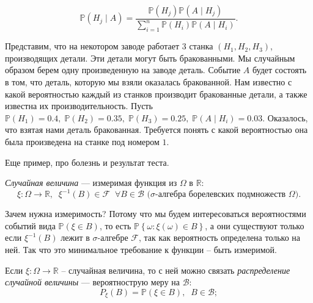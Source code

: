 \documentclass[12pt,a4paper]{article}
\begin{document}
\begin{definition}
    \[\mathbb{P}(H_j \mid A) = \frac{\mathbb{P} (H_j) \mathbb{P} (A \mid H_j)}{ \sum\limits_{i = 1}^{n} \mathbb{P}(H_i) \mathbb{P}(A \mid H_i)}.\]
\end{definition}

\begin{example}
    Представим, что на некотором заводе работает \(3\) станка \((H_1, H_2, H_3)\), производящих детали. Эти детали могут быть бракованными. 
    Мы случайным образом берем одну произведенную на заводе деталь. Событие \(A\) будет состоять в том, что деталь, которую мы взяли оказалась бракованной. Нам известно с какой вероятностью каждый из станков производит бракованные детали, а также известна их производительность.
    Пусть \(\mathbb{P}(H_1) = 0.4, \; \mathbb{P}(H_2) = 0.35, \; \mathbb{P}(H_3) = 0.25, \; \mathbb{P}(A \mid H_i) = 0.03.\) Оказалось, что взятая нами деталь бракованная. Требуется понять с какой вероятностью она была произведена на станке под номером \(1\).

\end{example}

\begin{example}
    Еще пример, про болезнь и результат теста.
\end{example}

\begin{definition}
    \textit{Случайная величина} --- измеримая функция из \(\Omega\) в \(\mathbb{R}\): \[\xi : \Omega \to \mathbb{R}, \; \; \xi^{-1}(B) \in \mathcal{F} \;\; \forall B \in \mathcal{B} \text{ (} \sigma \text{-алгебра борелевских подмножеств } \Omega \text{)}.\]
\end{definition}

\begin{remark}
    Зачем нужна измеримость? Потому что мы будем интересоваться вероятностями событий вида \(\mathbb{P}(\xi \in B)\), то есть \(\mathbb{P}\left\{ \omega : \xi(\omega) \in B\right\}\), а они существуют только если \(\xi^{-1}(B)\) лежит в \(\sigma\)-алгебре \(\mathcal{F}\), так как вероятность определена только на ней. Так что это минимальное требование к функции -- быть измеримой.
\end{remark}

\begin{definition}
    Если \(\xi : \Omega \to \mathbb{R}\) -- случайная величина, то с ней можно связать \textit{распределение случайной величины} --- вероятнострую меру на \(\mathcal{B}\): \[P_{\xi}(B) = \mathbb{P}(\xi \in B), \; \; B \in \mathcal{B};\]
\end{definition}
\end{document}
